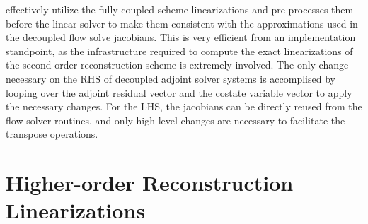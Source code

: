  effectively utilize the
fully coupled scheme linearizations and pre-processes them before the linear
solver to make them consistent with the approximations used in the decoupled
flow solve jacobians.  This is very efficient from an implementation standpoint,
as the infrastructure required to compute the exact linearizations of the
second-order reconstruction scheme is extremely involved.  The only change
necessary on the RHS of decoupled adjoint solver systems is accomplised by
looping over the adjoint residual vector and the costate variable vector to
apply the necessary changes.  For the LHS, the jacobians can be directly reused
from the flow solver routines, and only high-level changes are necessary to
facilitate the transpose operations.


\section{Higher-order Reconstruction Linearizations}
\label{sec:higher-order-linearizations}

